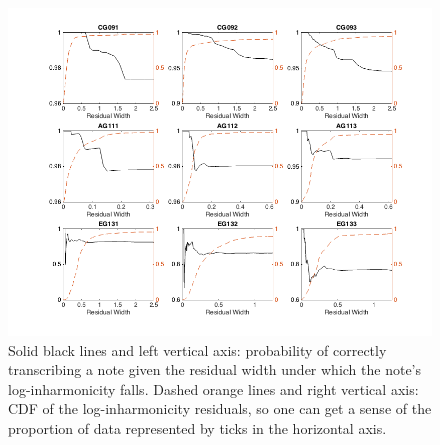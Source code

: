 \documentclass[12pt]{cmuthesis}
\begin{document}
\begin{figure}[!htbp] 
\centering
\includegraphics[angle=90,scale=0.65]{p-correct-res}
\caption{Solid black lines and left vertical axis: probability of correctly transcribing a note given the residual width under which the note's log-inharmonicity falls. Dashed orange lines and right vertical axis: CDF of the log-inharmonicity residuals, so one can get a sense of the proportion of data represented by ticks in the horizontal axis.}
\label{fig:p-correct-res}
\end{figure} 


\end{document}
